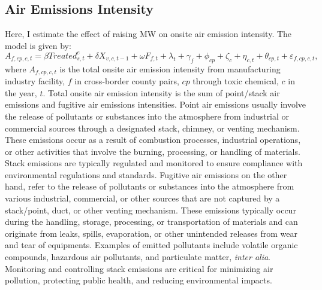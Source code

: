 \documentclass{C:/Users/david/OneDrive/Documents/ULMS/PhD/Thesis/chapter3/src/climate_change/latex/Economic_Journal/OUP-EJ}
\begin{document}
    \subsection{Air Emissions Intensity}\label{subsec:air-emission-intensity}
    Here, I estimate the effect of raising MW on onsite air emission intensity. The model is given by:
    \begin{equation}
        A_{f,cp,c,t} = \beta Treated_{s,t}^e + \delta X_{v,c,t-1} + \omega F_{f,t} + \lambda_{t} + \gamma_{f} + \phi_{cp} + \zeta_{c} + \eta_{c,t} + \theta_{cp,t} + \varepsilon_{f,cp,c,t},\label{eq:baseline-onsite-air-emission-intensity}
    \end{equation}
    where $A_{f,cp,c,t}$ is the total onsite air emission intensity from manufacturing industry facility, $f$ in cross-border county pairs, $cp$ through toxic chemical, $c$ in the year, $t$. Total onsite air emission intensity is the sum of point/stack air emissions and fugitive air emissions intensities. Point air emissions usually involve the release of pollutants or substances into the atmosphere from industrial or commercial sources through a designated stack, chimney, or venting mechanism. These emissions occur as a result of combustion processes, industrial operations, or other activities that involve the burning, processing, or handling of materials. Stack emissions are typically regulated and monitored to ensure compliance with environmental regulations and standards. Fugitive air emissions on the other hand, refer to the release of pollutants or substances into the atmosphere from various industrial, commercial, or other sources that are not captured by a stack/point, duct, or other venting mechanism. These emissions typically occur during the handling, storage, processing, or transportation of materials and can originate from leaks, spills, evaporation, or other unintended releases from wear and tear of equipments. Examples of emitted pollutants include volatile organic compounds, hazardous air pollutants, and particulate matter, \textit{inter alia}. Monitoring and controlling stack emissions are critical for minimizing air pollution, protecting public health, and reducing environmental impacts.
    
\end{document}
